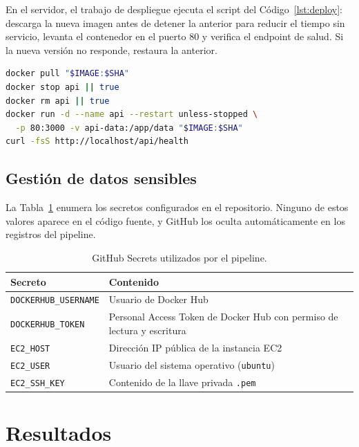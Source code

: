 \documentclass[12pt,letterpaper]{article}
\begin{document}
En el servidor, el trabajo de despliegue ejecuta el script del Código~\ref{lst:deploy}: descarga la nueva imagen antes de detener la anterior para reducir el tiempo sin servicio, levanta el contenedor en el puerto 80 y verifica el endpoint de salud. Si la nueva versión no responde, restaura la anterior.

\begin{lstlisting}[language=bash, caption={Script de despliegue ejecutado en la instancia EC2.}, label={lst:deploy}]
docker pull "$IMAGE:$SHA"
docker stop api || true
docker rm api || true
docker run -d --name api --restart unless-stopped \
  -p 80:3000 -v api-data:/app/data "$IMAGE:$SHA"
curl -fsS http://localhost/api/health
\end{lstlisting}

\subsection{Gestión de datos sensibles}

La Tabla~\ref{tab:secrets} enumera los secretos configurados en el repositorio. Ninguno de estos valores aparece en el código fuente, y GitHub los oculta automáticamente en los registros del pipeline.

\begin{table}[H]
  \centering
  \caption{GitHub Secrets utilizados por el pipeline.}
  \label{tab:secrets}
  \begin{tabularx}{\textwidth}{l X}
    \toprule
    Secreto & Contenido \\
    \midrule
    \texttt{DOCKERHUB\_USERNAME} & Usuario de Docker Hub \\
    \texttt{DOCKERHUB\_TOKEN}    & Personal Access Token de Docker Hub con permiso de lectura y escritura \\
    \texttt{EC2\_HOST}           & Dirección IP pública de la instancia EC2 \\
    \texttt{EC2\_USER}           & Usuario del sistema operativo (\texttt{ubuntu}) \\
    \texttt{EC2\_SSH\_KEY}       & Contenido de la llave privada \texttt{.pem} \\
    \bottomrule
  \end{tabularx}
\end{table}

\section{Resultados}
\end{document}
